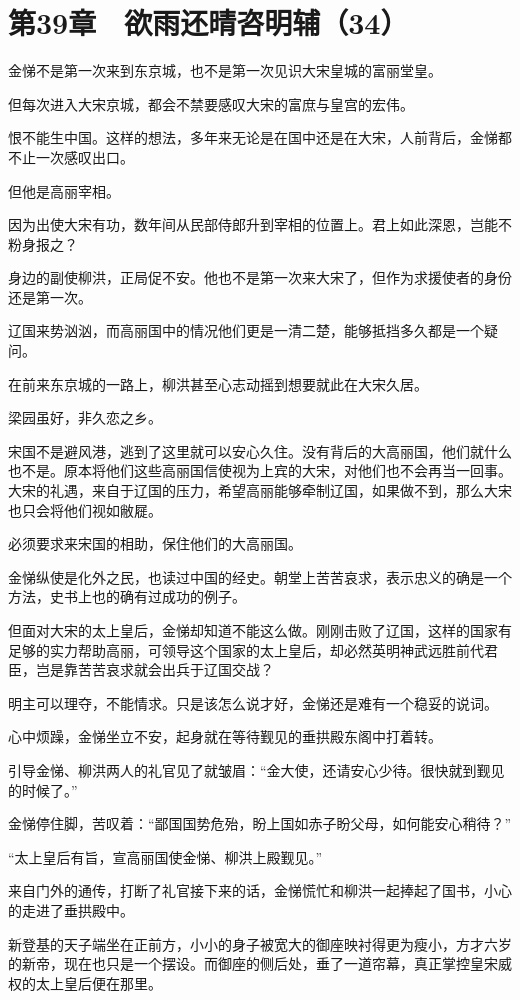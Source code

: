 \section{第39章　欲雨还晴咨明辅（34）}

金悌不是第一次来到东京城，也不是第一次见识大宋皇城的富丽堂皇。

但每次进入大宋京城，都会不禁要感叹大宋的富庶与皇宫的宏伟。

恨不能生中国。这样的想法，多年来无论是在国中还是在大宋，人前背后，金悌都不止一次感叹出口。

但他是高丽宰相。

因为出使大宋有功，数年间从民部侍郎升到宰相的位置上。君上如此深恩，岂能不粉身报之？

身边的副使柳洪，正局促不安。他也不是第一次来大宋了，但作为求援使者的身份还是第一次。

辽国来势汹汹，而高丽国中的情况他们更是一清二楚，能够抵挡多久都是一个疑问。

在前来东京城的一路上，柳洪甚至心志动摇到想要就此在大宋久居。

梁园虽好，非久恋之乡。

宋国不是避风港，逃到了这里就可以安心久住。没有背后的大高丽国，他们就什么也不是。原本将他们这些高丽国信使视为上宾的大宋，对他们也不会再当一回事。大宋的礼遇，来自于辽国的压力，希望高丽能够牵制辽国，如果做不到，那么大宋也只会将他们视如敝屣。

必须要求来宋国的相助，保住他们的大高丽国。

金悌纵使是化外之民，也读过中国的经史。朝堂上苦苦哀求，表示忠义的确是一个方法，史书上也的确有过成功的例子。

但面对大宋的太上皇后，金悌却知道不能这么做。刚刚击败了辽国，这样的国家有足够的实力帮助高丽，可领导这个国家的太上皇后，却必然英明神武远胜前代君臣，岂是靠苦苦哀求就会出兵于辽国交战？

明主可以理夺，不能情求。只是该怎么说才好，金悌还是难有一个稳妥的说词。

心中烦躁，金悌坐立不安，起身就在等待觐见的垂拱殿东阁中打着转。

引导金悌、柳洪两人的礼官见了就皱眉：“金大使，还请安心少待。很快就到觐见的时候了。”

金悌停住脚，苦叹着：“鄙国国势危殆，盼上国如赤子盼父母，如何能安心稍待？”

“太上皇后有旨，宣高丽国使金悌、柳洪上殿觐见。”

来自门外的通传，打断了礼官接下来的话，金悌慌忙和柳洪一起捧起了国书，小心的走进了垂拱殿中。

新登基的天子端坐在正前方，小小的身子被宽大的御座映衬得更为瘦小，方才六岁的新帝，现在也只是一个摆设。而御座的侧后处，垂了一道帘幕，真正掌控皇宋威权的太上皇后便在那里。

